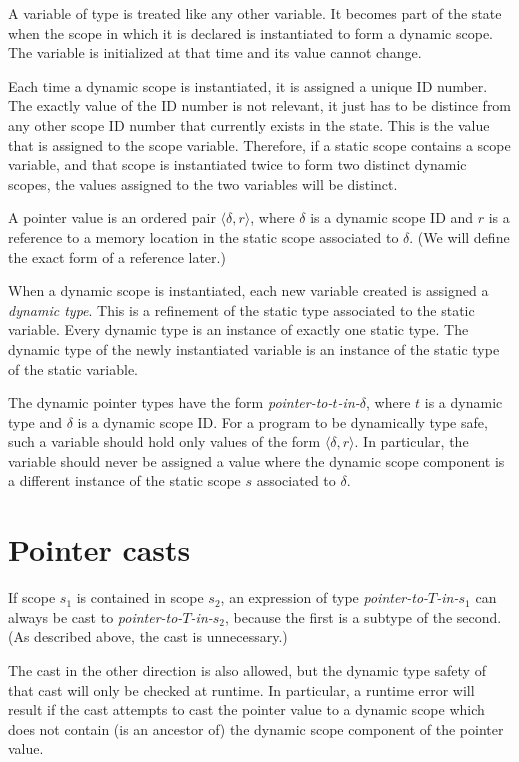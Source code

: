 A variable of type \cscope{} is treated like any other variable.
It becomes part of the state when the scope in which it is declared
is instantiated to form a dynamic scope.  The variable is 
initialized  at that time and its value cannot change.

Each time a dynamic scope is instantiated, it is assigned a unique ID
number.  The exactly value of the ID number is not relevant, it just
has to be distince from any other scope ID number that currently
exists in the state.  This is the value that is assigned to the scope
variable.  Therefore, if a static scope contains a scope variable, and
that scope is instantiated twice to form two distinct dynamic scopes,
the values assigned to the two variables will be distinct.

A pointer value is an ordered pair $\langle \delta,r \rangle$, where
$\delta$ is a dynamic scope ID and $r$ is a reference to a memory
location in the static scope associated to $\delta$.  (We will define
the exact form of a reference later.)

When a dynamic scope is instantiated, each new variable created is
assigned a \emph{dynamic type}.  This is a refinement of the static
type associated to the static variable.   Every dynamic type
is an instance of exactly one static type.  The dynamic
type of the newly instantiated variable is an instance of the
static type of the static variable.

The dynamic pointer types have the form
\emph{pointer-to-$t$-in-$\delta$}, where $t$ is a dynamic type and
$\delta$ is a dynamic scope ID.  For a program to be dynamically type
safe, such a variable should hold only values of the form $\langle
\delta, r\rangle$.  In particular, the variable should never be
assigned a value where the dynamic scope component is a different
instance of the static scope $s$ associated to $\delta$.

\section{Pointer casts}

If scope $s_1$ is contained in scope $s_2$, an expression of type
\emph{pointer-to-$T$-in-$s_1$} can always be cast to
\emph{pointer-to-$T$-in-$s_2$},
 because the first is a subtype of the second.  (As described above,
the cast is unnecessary.)  

The cast in the other direction is also allowed, but the dynamic type
safety of that cast will only be checked at runtime.  In particular, a
runtime error will result if the cast attempts to cast the pointer
value to a dynamic scope which does not contain (is an ancestor of)
the dynamic scope component of the pointer value.

